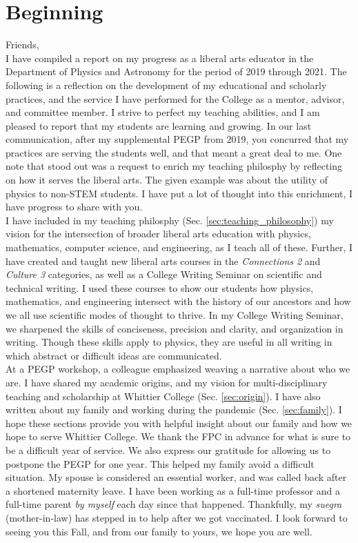 \documentclass[../../main.tex]{subfiles}
\begin{document}
\section{Beginning}

Friends,
\\
\vspace{0.25cm}
I have compiled a report on my progress as a liberal arts educator in the Department of Physics and Astronomy for the period of 2019 through 2021.  The following is a reflection on the development of my educational and scholarly practices, and the service I have performed for the College as a mentor, advisor, and committee member.  I strive to perfect my teaching abilities, and I am pleased to report that my students are learning and growing.  In our last communication, after my supplemental PEGP from 2019, you concurred that my practices are serving the students well, and that meant a great deal to me.  One note that stood out was a request to enrich my teaching philosphy by reflecting on how it serves the liberal arts.  The given example was about the utility of physics to non-STEM students.  I have put a lot of thought into this enrichment, I have progress to share with you.
\\
\vspace{0.25cm}
I have included in my teaching philosphy (Sec. \ref{sec:teaching_philosophy}) my vision for the intersection of broader liberal arts education with physics, mathematics, computer science, and engineering, as I teach all of these.  Further, I have created and taught new liberal arts courses in the \textit{Connections 2} and \textit{Culture 3} categories, as well as a College Writing Seminar on scientific and technical writing.  I used these courses to show our students how physics, mathematics, and engineering intersect with the history of our ancestors and how we all use scientific modes of thought to thrive.  In my College Writing Seminar, we sharpened the skills of conciseness, precision and clarity, and organization in writing.  Though these skills apply to physics, they are useful in all writing in which abstract or difficult ideas are communicated.
\\
\vspace{0.25cm}
At a PEGP workshop, a colleague emphasized weaving a narrative about who we are.  I have shared my academic origins, and my vision for multi-disciplinary teaching and scholarship at Whittier College (Sec. \ref{sec:origin}).  I have also written about my family and working during the pandemic (Sec. \ref{sec:family}).  I hope these sections provide you with helpful insight about our family and how we hope to serve Whittier College.  We thank the FPC in advance for what is sure to be a difficult year of service.  We also express our gratitude for allowing us to postpone the PEGP for one year.  This helped my family avoid a difficult situation.  My spouse is considered an essential worker, and was called back after a shortened maternity leave.  I have been working as a full-time professor and a full-time parent \textit{by myself} each day since that happened.  Thankfully, my \textit{suegra} (mother-in-law) has stepped in to help after we got vaccinated.  I look forward to seeing you this Fall, and from our family to yours, we hope you are well.
\end{document}

